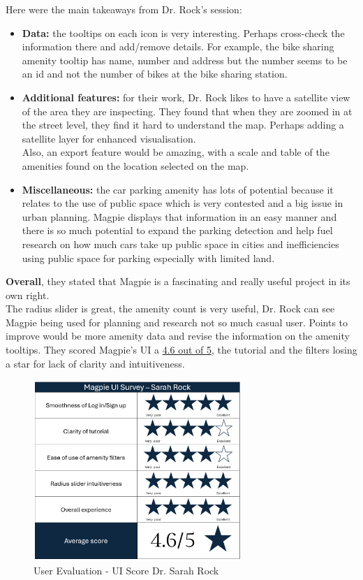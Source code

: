 \newpage Here were the main takeaways from Dr. Rock's session:
\begin{itemize}
    \item \textbf{Data:} the tooltips on each icon is very interesting. Perhaps cross-check the information there and add/remove details. For example, the bike sharing amenity tooltip has name, number and address but the number seems to be an id and not the number of bikes at the bike sharing station.\\
    \item \textbf{Additional features:} for their work, Dr. Rock likes to have a satellite view of the area they are inspecting. They found that when they are zoomed in at the street level, they find it hard to understand the map. Perhaps adding a satellite layer for enhanced visualisation.\\ Also, an export feature would be amazing, with a scale and table of the amenities found on the location selected on the map.\\
    \item \textbf{Miscellaneous:} the car parking amenity has lots of potential because it relates to the use of public space which is very contested and a big issue in urban planning. Magpie displays that information in an easy manner and there is so much potential to expand the parking detection and help fuel research on how much cars take up public space in cities and inefficiencies using public space for parking especially with limited land.
\end{itemize}
\textbf{Overall}, they stated that Magpie is a fascinating and really useful project in its own right.\\
The radius slider is great, the amenity count is very useful, Dr. Rock can see Magpie being used for planning and research not so much casual user. Points to improve would be more amenity data and revise the information on the amenity tooltips. They scored Magpie's UI a \underline{4.6 out of 5}, the tutorial and the filters losing a star for lack of clarity and intuitiveness.
\begin{figure}[h!]
    \centering
    \includegraphics[width=0.7\textwidth]{images/survey-sarah.png}
    \caption{User Evaluation - UI Score Dr. Sarah Rock}
\end{figure}\\


